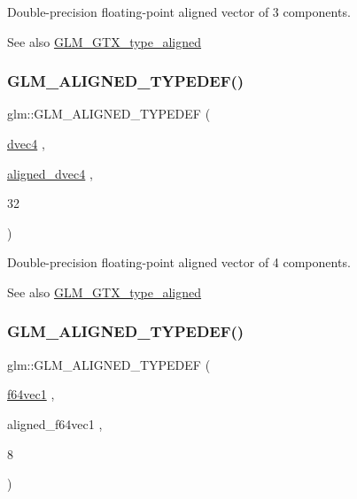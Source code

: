 Double-\/precision floating-\/point aligned vector of 3 components. \begin{DoxySeeAlso}{See also}
\mbox{\hyperlink{group__gtx__type__aligned}{G\+L\+M\+\_\+\+G\+T\+X\+\_\+type\+\_\+aligned}} 
\end{DoxySeeAlso}
\mbox{\label{group__gtx__type__aligned_ga687d5b8f551d5af32425c0b2fba15e99}} 
\subsubsection{\texorpdfstring{GLM\_ALIGNED\_TYPEDEF()}{GLM\_ALIGNED\_TYPEDEF()}\hspace{0.1cm}{\footnotesize\ttfamily [158/209]}}
{\footnotesize\ttfamily glm\+::\+G\+L\+M\+\_\+\+A\+L\+I\+G\+N\+E\+D\+\_\+\+T\+Y\+P\+E\+D\+EF (\begin{DoxyParamCaption}\item[{\mbox{\hyperlink{group__core__types_ga0824ceed7ec3b2fba89765501c1540b5}{dvec4}}}]{,  }\item[{\mbox{\hyperlink{group__gtc__type__aligned_ga502d8d084a488118c9a5466d73ba1a46}{aligned\+\_\+dvec4}}}]{,  }\item[{32}]{ }\end{DoxyParamCaption})}

Double-\/precision floating-\/point aligned vector of 4 components. \begin{DoxySeeAlso}{See also}
\mbox{\hyperlink{group__gtx__type__aligned}{G\+L\+M\+\_\+\+G\+T\+X\+\_\+type\+\_\+aligned}} 
\end{DoxySeeAlso}
\mbox{\label{group__gtx__type__aligned_ga8e842371d46842ff8f1813419ba49d0f}} 
\subsubsection{\texorpdfstring{GLM\_ALIGNED\_TYPEDEF()}{GLM\_ALIGNED\_TYPEDEF()}\hspace{0.1cm}{\footnotesize\ttfamily [159/209]}}
{\footnotesize\ttfamily glm\+::\+G\+L\+M\+\_\+\+A\+L\+I\+G\+N\+E\+D\+\_\+\+T\+Y\+P\+E\+D\+EF (\begin{DoxyParamCaption}\item[{\mbox{\hyperlink{group__gtc__type__precision_ga4c945cd13adbebd25ea3df003efb92ef}{f64vec1}}}]{,  }\item[{aligned\+\_\+f64vec1}]{,  }\item[{8}]{ }\end{DoxyParamCaption})}

